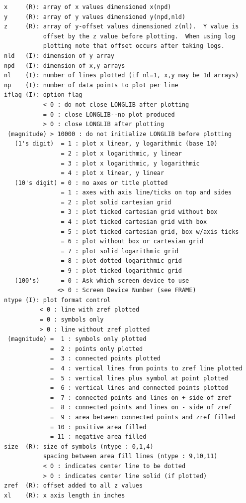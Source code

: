 \documentclass[11pt]{report}
\begin{document}
\begin{verbatim}
x     (R): array of x values dimensioned x(npd)
y     (R): array of y values dimensioned y(npd,nld)
z     (R): array of y-offset values dimensioned z(nl).  Y value is
           offset by the z value before plotting.  When using log
           plotting note that offset occurs after taking logs.
nld   (I): dimension of y array
npd   (I): dimension of x,y arrays
nl    (I): number of lines plotted (if nl=1, x,y may be 1d arrays)
np    (I): number of data points to plot per line
iflag (I): option flag
           < 0 : do not close LONGLIB after plotting
           = 0 : close LONGLIB--no plot produced
           > 0 : close LONGLIB after plotting
 (magnitude) > 10000 : do not initialize LONGLIB before plotting
   (1's digit)  = 1 : plot x linear, y logarithmic (base 10)
                = 2 : plot x logarithmic, y linear
                = 3 : plot x logarithmic, y logarithmic
                = 4 : plot x linear, y linear
   (10's digit) = 0 : no axes or title plotted
                = 1 : axes with axis line/ticks on top and sides
                = 2 : plot solid cartesian grid
                = 3 : plot ticked cartesian grid without box
                = 4 : plot ticked cartesian grid with box
                = 5 : plot ticked cartesian grid, box w/axis ticks
                = 6 : plot without box or cartesian grid
                = 7 : plot solid logarithmic grid
                = 8 : plot dotted logarithmic grid
                = 9 : plot ticked logarithmic grid
   (100's)      = 0 : Ask which screen device to use
               <> 0 : Screen Device Number (see FRAME)
ntype (I): plot format control
          < 0 : line with zref plotted
          = 0 : symbols only 
          > 0 : line without zref plotted
 (magnitude) =  1 : symbols only plotted
             =  2 : points only plotted 
             =  3 : connected points plotted
             =  4 : vertical lines from points to zref line plotted
             =  5 : vertical lines plus symbol at point plotted
             =  6 : vertical lines and connected points plotted
             =  7 : connected points and lines on + side of zref
             =  8 : connected points and lines on - side of zref
             =  9 : area between connected points and zref filled
             = 10 : positive area filled
             = 11 : negative area filled
size  (R): size of symbols (ntype : 0,1,4)
           spacing between area fill lines (ntype : 9,10,11)
           < 0 : indicates center line to be dotted
           > 0 : indicates center line solid (if plotted)
zref  (R): offset added to all z values
xl    (R): x axis length in inches

\end{verbatim}
\end{document}
